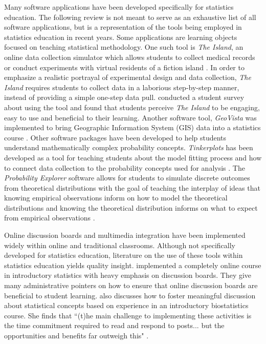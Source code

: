 \documentclass[11pt]{isuthesis}
\begin{document}
Many software applications have been developed specifically for statistics education. The following review is not meant to serve as an exhaustive list of all software applications, but is a representation of the tools being employed in statistics education in recent years. Some applications are learning objects focused on teaching statistical methodology. One such tool is \textit{The Island}, an online data collection simulator which allows students to collect medical records or conduct experiments with virtual residents of a fiction island \citep{Bulmer2011}. In order to emphasize a realistic portrayal of experimental design and data collection, \textit{The Island} requires students to collect data in a laborious step-by-step manner, instead of providing a simple one-step data pull. \citet{BaglinBedfordBulmer2013} conducted a student survey about using the tool and found that students perceive \textit{The Island} to be engaging, easy to use and beneficial to their learning. Another software tool, \textit{GeoVista} was implemented to bring Geographic Information System (GIS) data into a statistics course \citep{Forbes2012}. Other software packages have been developed to help students understand mathematically complex probability concepts. \textit{Tinkerplots} has been developed as a tool for teaching students about the model fitting process and how to connect data collection to the probability concepts used for analysis \citep{Konold2008}. The \textit{Probability Explorer} software allows for students to simulate discrete outcomes from theoretical distributions with the goal of teaching the interplay of ideas that knowing empirical observations inform on how to model the theoretical distributions and knowing the theoretical distribution informs on what to expect from empirical observations \citep{Lee2009}.

Online discussion boards and multimedia integration have been implemented widely within online and traditional classrooms. Although not specifically developed for statistics education, literature on the use of these tools within statistics education yields quality insight. \citet{Everson2008} implemented a completely online course in introductory statistics with heavy emphasis on discussion boards. They give many administrative pointers on how to ensure that online discussion boards are beneficial to student learning. \citet{Schmidt2013} also discusses how to foster meaningful discussion about statistical concepts based on experience in an introductory biostatistics course.  She finds that ``(t)he main challenge to implementing these activities is the time commitment required to read and respond to posts... but the opportunities and benefits far outweigh this"  \citep[p.9]{Schmidt2013}. 
\end{document}
